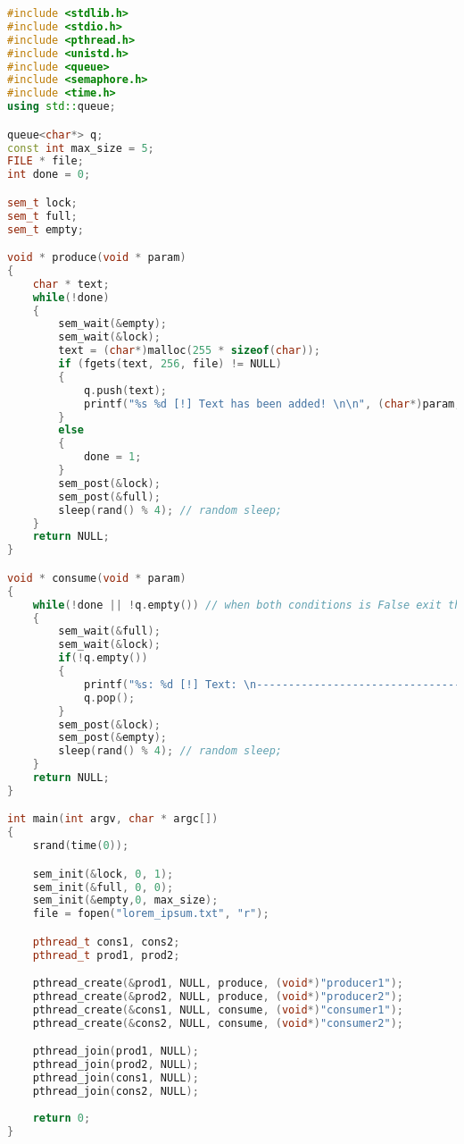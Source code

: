 \documentclass{article}
\begin{document}
\begin{lstlisting}[language=C++]
#include <stdlib.h>
#include <stdio.h>
#include <pthread.h>
#include <unistd.h>
#include <queue>
#include <semaphore.h>
#include <time.h>
using std::queue;

queue<char*> q;
const int max_size = 5;
FILE * file;
int done = 0;

sem_t lock;
sem_t full;
sem_t empty;

void * produce(void * param)
{
	char * text;
	while(!done)
	{
		sem_wait(&empty);
		sem_wait(&lock);
		text = (char*)malloc(255 * sizeof(char));
		if (fgets(text, 256, file) != NULL)
		{
			q.push(text);
			printf("%s %d [!] Text has been added! \n\n", (char*)param, pthread_self());
		}
		else
		{
			done = 1;
		}
		sem_post(&lock);
		sem_post(&full);
		sleep(rand() % 4); // random sleep;
	}
	return NULL;
}

void * consume(void * param)
{
	while(!done || !q.empty()) // when both conditions is False exit the loop;
	{
		sem_wait(&full);
		sem_wait(&lock);
		if(!q.empty())
		{
			printf("%s: %d [!] Text: \n----------------------------------\n %s-------------------------------------\n",(char*)param , pthread_self(), q.front());
			q.pop();
		}
		sem_post(&lock);
		sem_post(&empty);
		sleep(rand() % 4); // random sleep;
	}
	return NULL;
}

int main(int argv, char * argc[])
{
	srand(time(0));

	sem_init(&lock, 0, 1);
	sem_init(&full, 0, 0);
	sem_init(&empty,0, max_size);
	file = fopen("lorem_ipsum.txt", "r");

	pthread_t cons1, cons2;
	pthread_t prod1, prod2;

	pthread_create(&prod1, NULL, produce, (void*)"producer1");
	pthread_create(&prod2, NULL, produce, (void*)"producer2");
	pthread_create(&cons1, NULL, consume, (void*)"consumer1");
	pthread_create(&cons2, NULL, consume, (void*)"consumer2");

	pthread_join(prod1, NULL);
	pthread_join(prod2, NULL);
	pthread_join(cons1, NULL);
	pthread_join(cons2, NULL);
	
	return 0;
}
\end{lstlisting}
\end{document}
